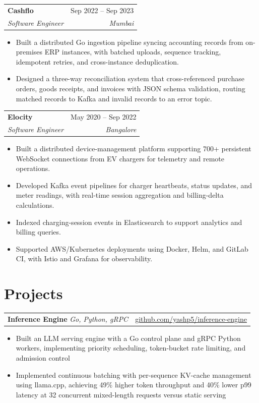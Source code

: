 \documentclass[letterpaper,12pt]{article}
\makeatletter
\newcommand{\entry}[4]{%
  \begin{tabularx}{\textwidth}{@{}X@{}r@{}}
    \textbf{#1} & {\small\color{muted}#2} \\
    {\small\itshape #3} & {\small\itshape\color{muted}#4} \\
  \end{tabularx}\vspace{3pt}
}
\newcommand{\project}[3]{%
  \begin{tabularx}{\textwidth}{@{}X@{}r@{}}
    \textbf{#1}\; {\small\color{muted}\itshape #2} & {\small #3} \\
  \end{tabularx}\vspace{3.5pt}
}
\newenvironment{bullets}
  {\begin{itemize}[leftmargin=1.1em, itemsep=0pt, topsep=0pt, parsep=0pt, label={\color{muted}\footnotesize\textbullet}]\fontsize{11}{13.0}\selectfont}
  {\end{itemize}\vspace{-3pt}}
\makeatother
\begin{document}
\vspace{7pt}
\entry{Cashflo}{Sep 2022 -- Sep 2023}{Software Engineer}{Mumbai}
\begin{bullets}
  \item Built a distributed Go ingestion pipeline syncing accounting records from on-premises ERP instances, with batched uploads, sequence tracking, idempotent retries, and cross-instance deduplication.
  \item Designed a three-way reconciliation system that cross-referenced purchase orders, goods receipts, and invoices with JSON schema validation, routing matched records to Kafka and invalid records to an error topic.
\end{bullets}

\vspace{7pt}
\entry{Elocity}{May 2020 -- Sep 2022}{Software Engineer}{Bangalore}
\begin{bullets}
  \item Built a distributed device-management platform supporting 700+ persistent WebSocket connections from EV chargers for telemetry and remote operations.
  \item Developed Kafka event pipelines for charger heartbeats, status updates, and meter readings, with real-time session aggregation and billing-delta calculations.
  \item Indexed charging-session events in Elasticsearch to support analytics and billing queries.
  \item Supported AWS/Kubernetes deployments using Docker, Helm, and GitLab CI, with Istio and Grafana for observability.
\end{bullets}

\section{Projects}

\project{Inference Engine}{Go, Python, gRPC}{\href{https://github.com/yashp5/inference-engine}{github.com/yashp5/inference-engine}}
\begin{bullets}
  \item Built an LLM serving engine with a Go control plane and gRPC Python workers, implementing priority scheduling, token-bucket rate limiting, and admission control
  \item Implemented continuous batching with per-sequence KV-cache management using llama.cpp, achieving 49\% higher token throughput and 40\% lower p99 latency at 32 concurrent mixed-length requests versus static serving
\end{bullets}
\end{document}
